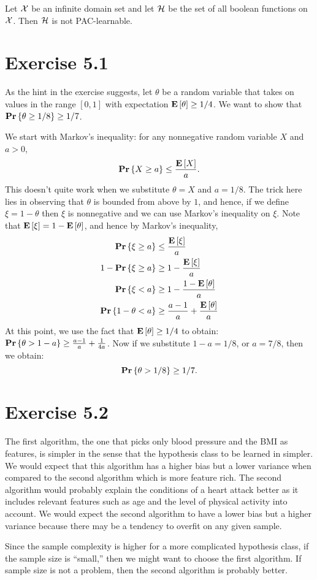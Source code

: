 \begin{corollary}
Let $\mathcal{X}$ be an infinite domain set and let $\mathcal{H}$ be the set of all boolean
functions on $\mathcal{X}$. Then $\mathcal{H}$ is not PAC-learnable.
\end{corollary}

\section*{Exercise 5.1}

As the hint in the exercise suggests, let $\theta$ be a random variable that takes
on values in the range $[0, 1]$ with expectation $\mathbf{E} \left [ \theta \right ] \geq 1 / 4$. We
want to show that $\mathbf{Pr} \left \{ \theta \geq 1 / 8 \right \} \geq 1 / 7$.

We start with Markov's inequality: for any nonnegative random variable $X$ and $a > 0$,
\[
    \mathbf{Pr} \left \{ X \geq a \right \} \leq \frac{\mathbf{E} \left [ X \right ]}{a}.
\]
This doesn't quite work when we substitute $\theta = X$ and $a = 1 / 8$. The
trick here lies in observing that $\theta$ is bounded from above by $1$, and
hence, if we define $\xi = 1 - \theta$ then $\xi$ is nonnegative and we can use
Markov's inequality on $\xi$. Note that $\mathbf{E} \left [ \xi \right ] =  1 - \mathbf{E} \left [ \theta \right ]$,
and hence by Markov's inequality,
\begin{align*}
    \mathbf{Pr} \left \{ \xi \geq a \right \} & \leq \frac{\mathbf{E} \left [ \xi \right ]}{a} \\
    1 -  \mathbf{Pr} \left \{ \xi \geq a \right \} & \geq 1 - \frac{\mathbf{E} \left [ \xi \right ]}{a} \\
    \mathbf{Pr} \left \{ \xi < a \right \} & \geq 1 - \frac{1 - \mathbf{E} \left [ \theta \right ]}{a} \\
    \mathbf{Pr} \left \{ 1 - \theta < a \right \} & \geq \frac{a - 1}{a} + \frac{\mathbf{E} \left [ \theta \right ]}{a}
\end{align*}
At this point, we use the fact that $\mathbf{E} \left [ \theta \right ] \geq 1 / 4$ to obtain:
$\mathbf{Pr} \left \{ \theta > 1 - a \right \} \geq \frac{a - 1}{a} + \frac{1}{4a}$. Now if we substitute
$1 - a =  1 / 8$, or $a = 7 / 8$, then we obtain:
\[
    \mathbf{Pr} \left \{ \theta > 1 / 8 \right \} \geq 1 / 7.
\]

\section*{Exercise 5.2}

The first algorithm, the one that picks only blood pressure and the BMI as
features, is simpler in the sense that the hypothesis class to be learned in
simpler. We would expect that this algorithm has a higher bias but a lower
variance when compared to the second algorithm which is more feature rich. The second
algorithm would probably explain the conditions of a heart attack better as it
includes relevant features such as age and the level of physical activity into
account. We would expect the second algorithm to have a lower bias but a higher
variance because there may be a tendency to overfit on any given sample.

Since the sample complexity is higher for a more complicated hypothesis class,
if the sample size is ``small,'' then we might want to choose the first algorithm.
If sample size is not a problem, then the second algorithm is probably better.
